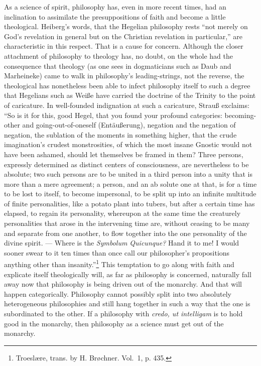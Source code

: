\documentclass[12pt]{book}
\newcommand{\opage}[1]{\marginnote{\footnotesize\textit{[#1]}}}
\begin{document}
As a science of spirit, philosophy has, even in more recent times, had an inclination to assimilate the presuppositions of faith and become a little theological. Heiberg's words, that the Hegelian philosophy rests ``not merely on God's revelation in general but on the Christian revelation in particular,'' are characteristic in this respect. That is a cause for concern. Although the closer attachment of philosophy to theology has, no doubt, on the whole had the consequence that theology (as one sees in dogmaticians such as Daub and Marheineke) came to walk in philosophy's leading-strings, not the reverse, the theological has nonetheless been able to infect philosophy itself to such a degree that Hegelians such as Weiße have carried the doctrine of the Trinity to the point of caricature. In well-founded indignation at such a caricature, Strauß exclaims: ``So is it for this, good Hegel, that you found your profound categories: becoming-other and going-out-of-oneself (Entäußerung), negation and the negation of negation, the sublation of the moments in something higher, that the crude imagination's crudest monstrosities, of which the most insane Gnostic would not have been ashamed, should let themselves be framed in them? Three persons, expressly determined as distinct centers of consciousness, are nevertheless to be absolute; two such persons are to be united in a third person into a unity that is more than a mere agreement; a person, and an ab%
\opage{110}\setcounter{footnote}{0}%
solute one at that, is for a time to be lost to itself, to become impersonal, to be split up into an infinite multitude of finite personalities, like a potato plant into tubers, but after a certain time has elapsed, to regain its personality, whereupon at the same time the creaturely personalities that arose in the intervening time are, without ceasing to be many and separate from one another, to flow together into the one personality of the divine spirit. --- Where is the \textit{Symbolum Quicunque?} Hand it to me! I would sooner swear to it ten times than once call our philosopher's propositions anything other than insanity.''\footnote{Troeslære, trans. by H. Brøchner. Vol.~1, p. 435.}
This temptation to go along with faith and explicate itself theologically will, as far as philosophy is concerned, naturally fall away now that philosophy is being driven out of the monarchy. And that will happen categorically. Philosophy cannot possibly split into two absolutely heterogeneous philosophies and still hang together in such a way that the one is subordinated to the other. If a philosophy with \textit{credo, ut intelligam} is to hold good in the monarchy, then philosophy as a science must get out of the monarchy.
\end{document}
